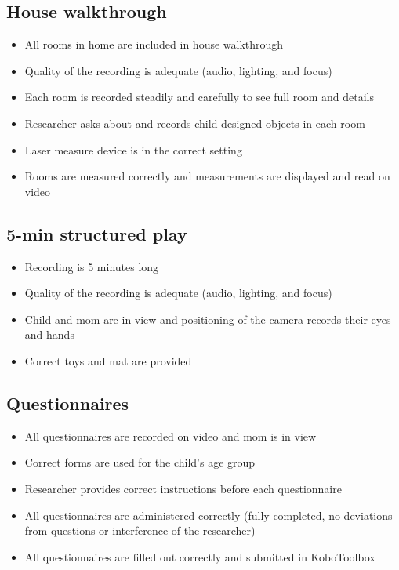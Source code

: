 \documentclass[
  12pt,
]{book}
\providecommand{\tightlist}{%
  \setlength{\itemsep}{0pt}\setlength{\parskip}{0pt}}
\begin{document}
\hypertarget{house-walkthrough}{%
\subsection{House walkthrough}\label{house-walkthrough}}

\begin{itemize}
\tightlist
\item
  All rooms in home are included in house walkthrough
\item
  Quality of the recording is adequate (audio, lighting, and focus)
\item
  Each room is recorded steadily and carefully to see full room and details
\item
  Researcher asks about and records child-designed objects in each room
\item
  Laser measure device is in the correct setting
\item
  Rooms are measured correctly and measurements are displayed and read on video
\end{itemize}

\hypertarget{min-structured-play}{%
\subsection{5-min structured play}\label{min-structured-play}}

\begin{itemize}
\tightlist
\item
  Recording is 5 minutes long
\item
  Quality of the recording is adequate (audio, lighting, and focus)
\item
  Child and mom are in view and positioning of the camera records their eyes and hands
\item
  Correct toys and mat are provided
\end{itemize}

\hypertarget{questionnaires-1}{%
\subsection{Questionnaires}\label{questionnaires-1}}

\begin{itemize}
\tightlist
\item
  All questionnaires are recorded on video and mom is in view
\item
  Correct forms are used for the child's age group
\item
  Researcher provides correct instructions before each questionnaire
\item
  All questionnaires are administered correctly (fully completed, no deviations from questions or interference of the researcher)
\item
  All questionnaires are filled out correctly and submitted in KoboToolbox
\end{itemize}
\end{document}
